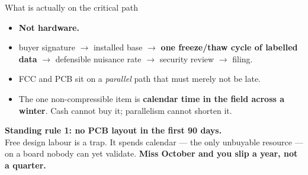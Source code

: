 \documentclass[aspectratio=169,t,10pt,xcolor={table,svgnames}]{beamer}
\begin{document}
\begin{frame}{What is actually on the critical path}
  \begin{itemize}
    \item \textbf{Not hardware.}
    \item buyer signature $\rightarrow$ installed base $\rightarrow$ \textbf{one freeze/thaw cycle of
          labelled data} $\rightarrow$ defensible nuisance rate $\rightarrow$ security review
          $\rightarrow$ filing.
    \item FCC and PCB sit on a \emph{parallel} path that must merely not be late.
    \item The one non-compressible item is \textbf{calendar time in the field across a winter}.
          Cash cannot buy it; parallelism cannot shorten it.
  \end{itemize}
  \vspace{0.6em}
  \begin{beamercolorbox}[wd=\textwidth,sep=1.6ex]{}
    \color{ink}\small \textbf{Standing rule 1: no PCB layout in the first 90 days.}\\
    Free design labour is a trap. It spends calendar --- the only unbuyable resource ---
    on a board nobody can yet validate. \textbf{Miss October and you slip a year, not a quarter.}
  \end{beamercolorbox}
\end{frame}
\end{document}
